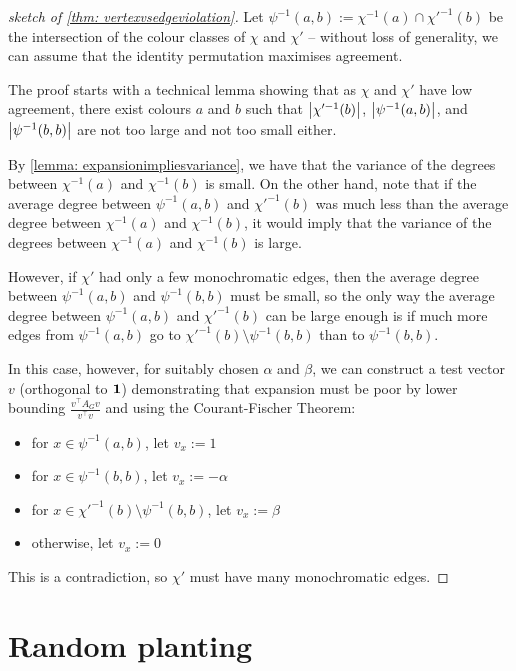 \begin{proof}[sketch of \cref{thm: vertexvsedgeviolation}]
    Let $\psi^{-1}(a, b) := \chi^{-1}(a) \cap \chi'^{-1}(b)$ be the intersection of the colour classes of $\chi$ and $\chi'$ -- without loss of generality, we can assume that the identity permutation maximises agreement. 

    The proof starts with a technical lemma showing that as $\chi$ and $\chi'$ have low agreement, there exist colours $a$ and $b$ such that $\left\lvert\chi'^{-1}(b)\right\rvert$, $\left\lvert\psi^{-1}(a, b)\right\rvert$, and $\left\lvert\psi^{-1}(b, b)\right\rvert$ are not too large and not too small either.

    By \cref{lemma: expansionimpliesvariance}, we have that the variance of the degrees between $\chi^{-1}(a)$ and $\chi^{-1}(b)$ is small. On the other hand, note that if the average degree between $\psi^{-1}(a, b)$ and $\chi'^{-1}(b)$ was much less than the average degree between $\chi^{-1}(a)$ and $\chi^{-1}(b)$, it would imply that the variance of the degrees between $\chi^{-1}(a)$ and $\chi^{-1}(b)$ is large.
    
    However, if $\chi'$ had only a few monochromatic edges, then the average degree between $\psi^{-1}(a, b)$ and $\psi^{-1}(b, b)$ must be small, so the only way the average degree between $\psi^{-1}(a, b)$ and $\chi'^{-1}(b)$ can be large enough is if much more edges from $\psi^{-1}(a, b)$ go to $\chi'^{-1}(b) \setminus \psi^{-1}(b, b)$ than to $\psi^{-1}(b, b)$.

    In this case, however, for suitably chosen $\alpha$ and $\beta$, we can construct a test vector $v$ (orthogonal to $\mathbf{1}$) demonstrating that expansion must be poor by lower bounding $\frac{v^\top A_G v}{v^\top v}$ and using the Courant-Fischer Theorem:

    \begin{itemize}
        \item for $x \in \psi^{-1}(a, b)$, let $v_x := 1$
        \item for $x \in \psi^{-1}(b, b)$, let $v_x := -\alpha$
        \item for $x \in \chi'^{-1}(b) \setminus \psi^{-1}(b, b)$, let $v_x := \beta$
        \item otherwise, let $v_x := 0$
    \end{itemize}

    This is a contradiction, so $\chi'$ must have many monochromatic edges.
\end{proof}

\section{Random planting}

